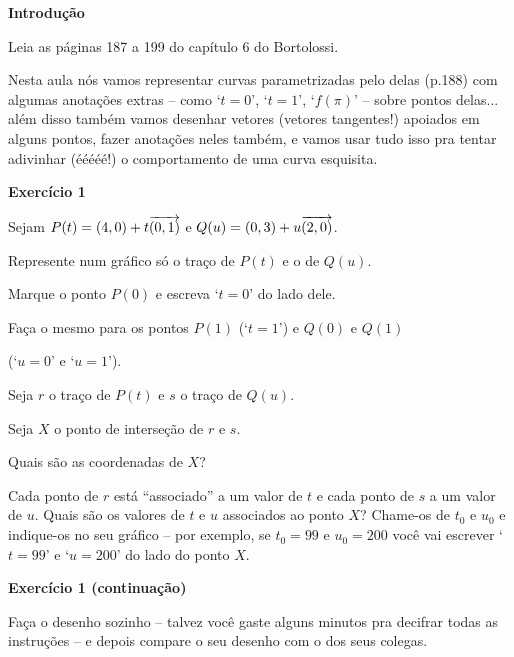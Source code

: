 \documentclass[oneside,12pt]{article}
\begin{document}
\newpage


{\bf Introdução}

Leia as páginas 187 a 199 do capítulo 6 do Bortolossi.

Nesta aula nós vamos representar curvas parametrizadas pelo
 delas (p.188) com algumas anotações extras -- como
`$t=0$', `$t=1$', `$f(π)$' -- sobre pontos delas... além disso também
vamos desenhar vetores (vetores tangentes!) apoiados em alguns pontos,
fazer anotações neles também, e vamos usar tudo isso pra tentar
adivinhar (ééééé!) o comportamento de uma curva esquisita.


\newpage


{\bf Exercício 1}

Sejam $P(t) = (4,0) + t{\overrightarrow{(0,1)}}$ e $Q(u) = (0,3) + u{\overrightarrow{(2,0)}}$.

Represente num gráfico só o traço de $P(t)$ e o de $Q(u)$.

Marque o ponto $P(0)$ e escreva `$t=0$' do lado dele.

Faça o mesmo para os pontos $P(1)$ (`$t=1$') e $Q(0)$ e $Q(1)$

(`$u=0$' e `$u=1$'). 

\msk

Seja $r$ o traço de $P(t)$ e $s$ o traço de $Q(u)$.

Seja $X$ o ponto de interseção de $r$ e $s$.

Quais são as coordenadas de $X$?

\msk

Cada ponto de $r$ está ``associado'' a um valor de $t$ e cada ponto de
$s$ a um valor de $u$. Quais são os valores de $t$ e $u$ associados ao
ponto $X$? Chame-os de $t_0$ e $u_0$ e indique-os no seu gráfico --
por exemplo, se $t_0=99$ e $u_0=200$ você vai escrever `$t=99$' e
`$u=200$' do lado do ponto $X$.

\newpage

{\bf Exercício 1 (continuação)}

Faça o desenho sozinho -- talvez você gaste alguns minutos pra
decifrar todas as instruções -- e depois compare o seu desenho com o
dos seus colegas.
\end{document}
